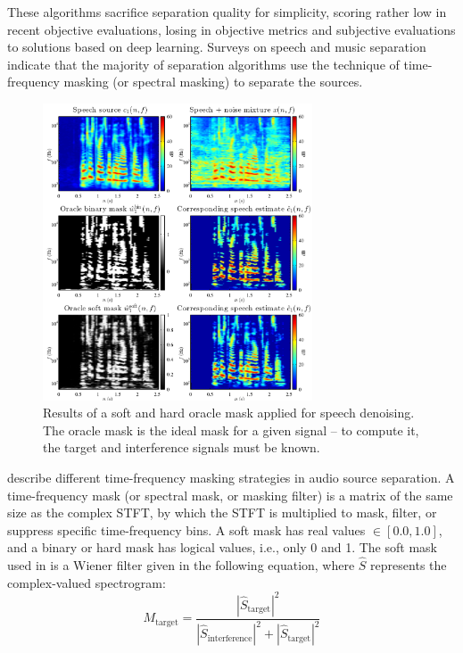 \documentclass[letter,12pt,notitlepage]{article}
\begin{document}
These algorithms sacrifice separation quality for simplicity, scoring rather low in recent objective evaluations\cite{sisec2018}, losing in objective metrics and subjective evaluations to solutions based on deep learning\cite{umx, demucs}.
Surveys on speech \cite{speechmask} and music separation \cite{musicmask} indicate that the majority of separation algorithms use the technique of time-frequency masking (or spectral masking) to separate the sources.

\begin{figure}[ht]
	\vspace{-1.0em}
	\includegraphics[width=8cm]{./images-mss/maskdemo.png}
	\caption{Results of a soft and hard oracle mask applied for speech denoising. The oracle mask is the ideal mask for a given signal -- to compute it, the target and interference signals must be known.}
	\label{fig:masks}
	\vspace{-1.5em}
\end{figure}

\textcite{masking} describe different time-frequency masking strategies in audio source separation. A time-frequency mask (or spectral mask, or masking filter) is a matrix of the same size as the complex STFT, by which the STFT is multiplied to mask, filter, or suppress specific time-frequency bins. A soft mask has real values $\in [0.0, 1.0]$, and a binary or hard mask has logical values, i.e., only 0 and 1. The soft mask used in \cite{fitzgerald1, fitzgerald2} is a Wiener filter given in the following equation, where $\hat{S}$ represents the complex-valued spectrogram:
\[ M_{\text{target}} = \frac{|\hat{S}_{\text{target}}|^{2}}{|\hat{S}_{\text{interference}}|^{2} + |\hat{S}_{\text{target}}|^{2}} \]
\end{document}
